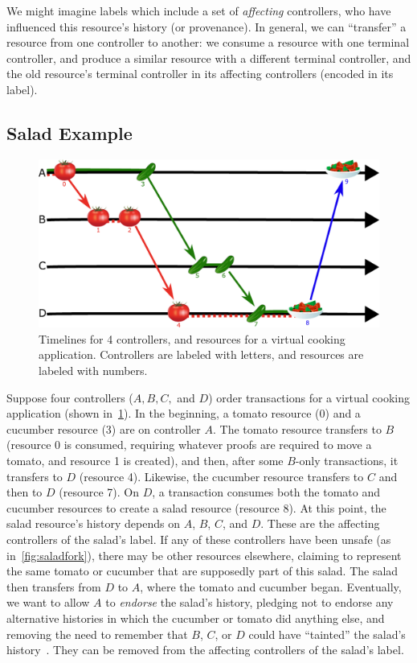 \documentclass[a4paper,USenglish,cleveref, autoref, thm-restate, anonymous]{lipics-v2021}
\begin{document}
We might imagine labels which include a set of \textit{affecting} controllers, who have influenced this resource's history (or provenance).
In general, we can ``transfer'' a resource from one controller to another: we consume a resource with one terminal controller, and produce a similar resource with a different terminal controller, and the old resource's terminal controller in its affecting controllers (encoded in its label). 

\subsection{Salad Example}
\begin{figure}
    \centering
    \includegraphics[width=\linewidth]{figs/salad_timeline.pdf}
    \caption{Timelines for 4 controllers, and resources for a virtual cooking application. Controllers are labeled with letters, and resources are labeled with numbers.}
    \label{fig:salad}
\end{figure}
Suppose four controllers ($A,B,C,$ and $D$) order transactions for a virtual cooking application (shown in~\cref{fig:salad}).
In the beginning, a tomato resource (0) and a cucumber resource (3) are on controller $A$.
The tomato resource transfers to $B$ (resource 0 is consumed, requiring whatever proofs are required to move a tomato, and resource 1 is created), and then, after some $B$-only transactions, it transfers to $D$ (resource 4).
Likewise, the cucumber resource transfers to $C$ and then to $D$ (resource 7).
On $D$, a transaction consumes both the tomato and cucumber resources to create a salad resource (resource 8). 
At this point, the salad resource's history depends on $A$, $B$, $C$, and $D$.
These are the affecting controllers of the salad's label.
If any of these controllers have been unsafe (as in~\cref{fig:saladfork}), there may be other resources elsewhere, claiming to represent the same tomato or cucumber that are supposedly part of this salad. 
The salad then transfers from $D$ to $A$, where the tomato and cucumber began.
Eventually, we want to allow $A$ to \emph{endorse} the salad's history, pledging not to endorse any alternative histories in which the cucumber or tomato did anything else, and removing the need to remember that $B$, $C$, or $D$ could have ``tainted'' the salad's history~\cite{dista}. 
They can be removed from the affecting controllers of the salad's label.
\end{document}
